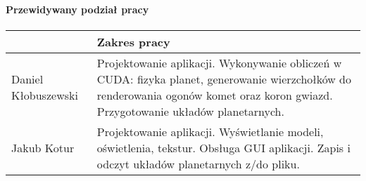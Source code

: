 \documentclass[a4paper,titlepage,10pt]{article}
\begin{document}
%        

	\paragraph{Przewidywany podział pracy}
	
	\paragraph{}
	\begin{tabular}{|l|p{10cm}|}
	\hline
	~ & Zakres pracy \\\hline
	\hline
	Daniel Kłobuszewski & Projektowanie aplikacji. Wykonywanie obliczeń w CUDA: fizyka planet, generowanie wierzchołków do renderowania ogonów komet oraz koron gwiazd. Przygotowanie układów planetarnych.\\\hline
	Jakub Kotur & Projektowanie aplikacji. Wyświetlanie modeli, oświetlenia, tekstur. Obsługa GUI aplikacji. Zapis i odczyt układów planetarnych z/do pliku.\\\hline
	\end{tabular}
\end{document}
